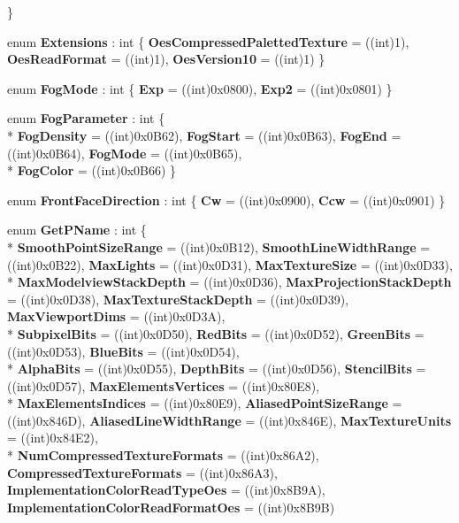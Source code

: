 \begin{DoxyCompactItemize}
 \}
\item 
enum {\bfseries Extensions} \-: int \{ {\bfseries Oes\-Compressed\-Paletted\-Texture} = ((int)1), 
{\bfseries Oes\-Read\-Format} = ((int)1), 
{\bfseries Oes\-Version10} = ((int)1)
 \}
\item 
enum {\bfseries Fog\-Mode} \-: int \{ {\bfseries Exp} = ((int)0x0800), 
{\bfseries Exp2} = ((int)0x0801)
 \}
\item 
enum {\bfseries Fog\-Parameter} \-: int \{ \\*
{\bfseries Fog\-Density} = ((int)0x0\-B62), 
{\bfseries Fog\-Start} = ((int)0x0\-B63), 
{\bfseries Fog\-End} = ((int)0x0\-B64), 
{\bfseries Fog\-Mode} = ((int)0x0\-B65), 
\\*
{\bfseries Fog\-Color} = ((int)0x0\-B66)
 \}
\item 
enum {\bfseries Front\-Face\-Direction} \-: int \{ {\bfseries Cw} = ((int)0x0900), 
{\bfseries Ccw} = ((int)0x0901)
 \}
\item 
enum {\bfseries Get\-P\-Name} \-: int \{ \\*
{\bfseries Smooth\-Point\-Size\-Range} = ((int)0x0\-B12), 
{\bfseries Smooth\-Line\-Width\-Range} = ((int)0x0\-B22), 
{\bfseries Max\-Lights} = ((int)0x0\-D31), 
{\bfseries Max\-Texture\-Size} = ((int)0x0\-D33), 
\\*
{\bfseries Max\-Modelview\-Stack\-Depth} = ((int)0x0\-D36), 
{\bfseries Max\-Projection\-Stack\-Depth} = ((int)0x0\-D38), 
{\bfseries Max\-Texture\-Stack\-Depth} = ((int)0x0\-D39), 
{\bfseries Max\-Viewport\-Dims} = ((int)0x0\-D3\-A), 
\\*
{\bfseries Subpixel\-Bits} = ((int)0x0\-D50), 
{\bfseries Red\-Bits} = ((int)0x0\-D52), 
{\bfseries Green\-Bits} = ((int)0x0\-D53), 
{\bfseries Blue\-Bits} = ((int)0x0\-D54), 
\\*
{\bfseries Alpha\-Bits} = ((int)0x0\-D55), 
{\bfseries Depth\-Bits} = ((int)0x0\-D56), 
{\bfseries Stencil\-Bits} = ((int)0x0\-D57), 
{\bfseries Max\-Elements\-Vertices} = ((int)0x80\-E8), 
\\*
{\bfseries Max\-Elements\-Indices} = ((int)0x80\-E9), 
{\bfseries Aliased\-Point\-Size\-Range} = ((int)0x846\-D), 
{\bfseries Aliased\-Line\-Width\-Range} = ((int)0x846\-E), 
{\bfseries Max\-Texture\-Units} = ((int)0x84\-E2), 
\\*
{\bfseries Num\-Compressed\-Texture\-Formats} = ((int)0x86\-A2), 
{\bfseries Compressed\-Texture\-Formats} = ((int)0x86\-A3), 
{\bfseries Implementation\-Color\-Read\-Type\-Oes} = ((int)0x8\-B9\-A), 
{\bfseries Implementation\-Color\-Read\-Format\-Oes} = ((int)0x8\-B9\-B)

\end{DoxyCompactItemize}

